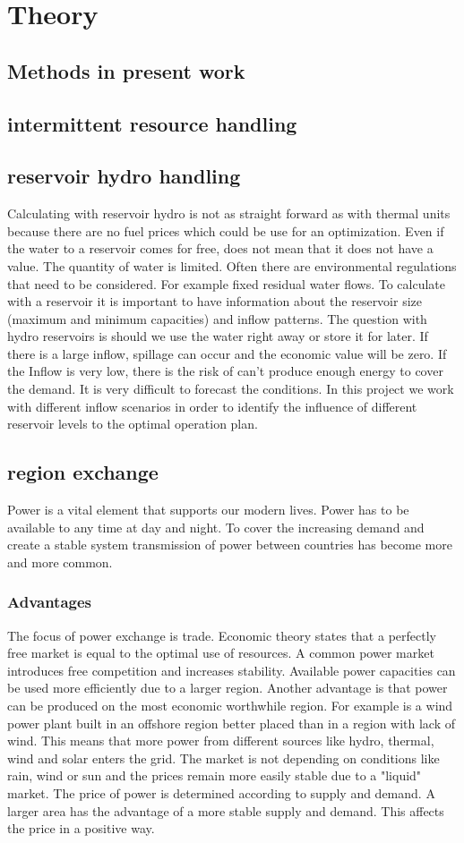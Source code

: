 \documentclass{article}
\begin{document}
\section{Theory}
\subsection{Methods in present work}
\subsection{intermittent resource handling}
\subsection{reservoir hydro handling}
Calculating with reservoir hydro is not as straight forward as with thermal units because there are no fuel prices which could be use for an optimization. Even if the water to a reservoir comes for free, does not mean that it does not have a value. The quantity of water is limited. Often there are environmental regulations that need to be considered. For example fixed residual water flows. To calculate with a reservoir it is important to have information about the reservoir size (maximum and minimum capacities) and inflow patterns. The question with hydro reservoirs is should we use the water right away or store it for later. If there is a large inflow, spillage can occur and the economic value will be zero. If the Inflow is very low, there is the risk of can’t produce enough energy to cover the demand. It is very difficult to forecast the conditions. In this project we work with different inflow scenarios in order to identify the influence of different reservoir levels to the optimal operation plan.
\subsection{region exchange}
Power is a vital element that supports our modern lives. Power has to be available to any time at day and night. To cover the increasing demand and create a stable system transmission of power between countries has become more and more common. 
\subsubsection{Advantages}
The focus of power exchange is trade. Economic theory states that a perfectly free market is equal to the optimal use of resources. A common power market introduces free competition and increases stability. Available power capacities can be used more efficiently due to a larger region. Another advantage is that power can be produced on the most economic worthwhile region. For example is a wind power plant built in an offshore region better placed than in a region with lack of wind. This means that more power from different sources like hydro, thermal, wind and solar enters the grid. The market is not depending on conditions like rain, wind or sun and the prices remain more easily stable due to a "liquid" market. The price of power is determined according to supply and demand. A larger area has the advantage of a more stable supply and demand. This affects the price in a positive way.
\end{document}
